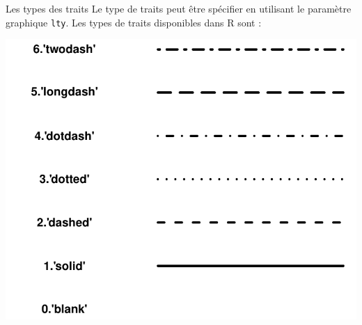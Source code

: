 \documentclass[
  8pt,
  ignorenonframetext,
]{beamer}
\begin{document}
\begin{frame}[fragile]{Les types des traits}
\protect\hypertarget{les-types-des-traits}{}
Le type de traits peut être spécifier en utilisant le paramètre
graphique \texttt{lty}. Les types de traits disponibles dans R sont :

\begin{center}\includegraphics{Chap2_R_files/figure-beamer/unnamed-chunk-6-1} \end{center}
\end{frame}
\end{document}
